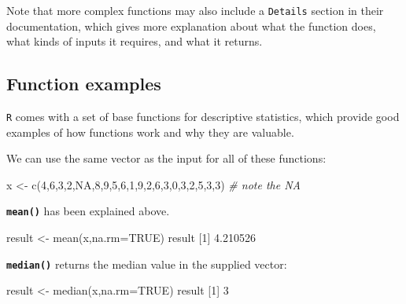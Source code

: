\documentclass[
]{book}
\newenvironment{Shaded}{\begin{snugshade}}{\end{snugshade}}
\newcommand{\AttributeTok}[1]{\textcolor[rgb]{0.77,0.63,0.00}{#1}}
\newcommand{\CommentTok}[1]{\textcolor[rgb]{0.56,0.35,0.01}{\textit{#1}}}
\newcommand{\ConstantTok}[1]{\textcolor[rgb]{0.00,0.00,0.00}{#1}}
\newcommand{\DecValTok}[1]{\textcolor[rgb]{0.00,0.00,0.81}{#1}}
\newcommand{\FloatTok}[1]{\textcolor[rgb]{0.00,0.00,0.81}{#1}}
\newcommand{\FunctionTok}[1]{\textcolor[rgb]{0.00,0.00,0.00}{#1}}
\newcommand{\NormalTok}[1]{#1}
\newcommand{\OtherTok}[1]{\textcolor[rgb]{0.56,0.35,0.01}{#1}}
\begin{document}
Note that more complex functions may also include a \texttt{Details} section in their documentation, which gives more explanation about what the function does, what kinds of inputs it requires, and what it returns.

\hypertarget{function-examples}{%
\subsection*{Function examples}\label{function-examples}}

\texttt{R} comes with a set of base functions for descriptive statistics, which provide good examples of how functions work and why they are valuable.

We can use the same vector as the input for all of these functions:

\begin{Shaded}
\begin{Highlighting}[]
\NormalTok{x }\OtherTok{\textless{}{-}} \FunctionTok{c}\NormalTok{(}\DecValTok{4}\NormalTok{,}\DecValTok{6}\NormalTok{,}\DecValTok{3}\NormalTok{,}\DecValTok{2}\NormalTok{,}\ConstantTok{NA}\NormalTok{,}\DecValTok{8}\NormalTok{,}\DecValTok{9}\NormalTok{,}\DecValTok{5}\NormalTok{,}\DecValTok{6}\NormalTok{,}\DecValTok{1}\NormalTok{,}\DecValTok{9}\NormalTok{,}\DecValTok{2}\NormalTok{,}\DecValTok{6}\NormalTok{,}\DecValTok{3}\NormalTok{,}\DecValTok{0}\NormalTok{,}\DecValTok{3}\NormalTok{,}\DecValTok{2}\NormalTok{,}\DecValTok{5}\NormalTok{,}\DecValTok{3}\NormalTok{,}\DecValTok{3}\NormalTok{)  }\CommentTok{\# note the NA}
\end{Highlighting}
\end{Shaded}

\textbf{\texttt{mean()}} has been explained above.

\begin{Shaded}
\begin{Highlighting}[]
\NormalTok{result }\OtherTok{\textless{}{-}} \FunctionTok{mean}\NormalTok{(x,}\AttributeTok{na.rm=}\ConstantTok{TRUE}\NormalTok{)}
\NormalTok{result}
\NormalTok{[}\DecValTok{1}\NormalTok{] }\FloatTok{4.210526}
\end{Highlighting}
\end{Shaded}

\textbf{\texttt{median()}} returns the median value in the supplied vector:

\begin{Shaded}
\begin{Highlighting}[]
\NormalTok{result }\OtherTok{\textless{}{-}} \FunctionTok{median}\NormalTok{(x,}\AttributeTok{na.rm=}\ConstantTok{TRUE}\NormalTok{)}
\NormalTok{result}
\NormalTok{[}\DecValTok{1}\NormalTok{] }\DecValTok{3}
\end{Highlighting}
\end{Shaded}
\end{document}
